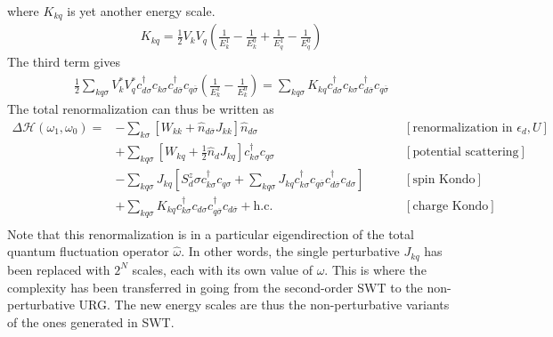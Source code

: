 \documentclass[twoside,11pt]{report}
\numberwithin{equation}{section}
\begin{document}
where \(K_{kq}\) is yet another energy scale.
\begin{equation}\begin{aligned}
	K_{kq} = \frac{1}{2}V_k V_q\left(\frac{1}{E_k^1} - \frac{1}{E_k^0} + \frac{1}{E_q^1} - \frac{1}{E_q^0}\right)
\end{aligned}\end{equation}
The third term gives
\begin{equation}\begin{aligned}
	\frac{1}{2}\sum_{kq\sigma}V^*_k V_q^* c^\dagger_{d\sigma}c_{k\sigma} c^\dagger_{d\overline\sigma}c_{q\overline\sigma}\left(\frac{1}{E_k^1} - \frac{1}{E_k^0}\right) = \sum_{kq\sigma} K_{kq}c^\dagger_{d\sigma}c_{k\sigma} c^\dagger_{d\overline\sigma}c_{q\overline\sigma}
\end{aligned}\end{equation}
The total renormalization can thus be written as
\begin{equation}\begin{aligned}
	\Delta \mathcal{H}(\omega_1,\omega_0) =& - \sum_{k\sigma}\left[W_{kk} + \hat n_{d\overline\sigma}J_{kk}\right]\hat n_{d\sigma} &&&& \left[\text{renormalization in \(\epsilon_d, U\)}\right]\\
					       &+ \sum_{kq\sigma}\left[W_{kq} + \frac{1}{2} \hat n_d J_{kq}\right]c^\dagger_{k\sigma}c_{q\sigma} &&&& \left[\text{potential scattering}\right]\\
					       &- \sum_{kq\sigma}J_{kq}\left[S_d^z \sigma c^\dagger_{k\sigma}c_{q\sigma} + \sum_{kq\sigma}J_{kq} c^\dagger_{k\sigma}c_{q\overline\sigma}c^\dagger_{d\overline\sigma}c_{d\sigma}\right]  &&&& \left[\text{spin Kondo}\right]\\
					       &+ \sum_{kq\sigma}K_{kq}c^\dagger_{k\sigma}c_{d\sigma} c^\dagger_{q\overline\sigma}c_{d\overline\sigma} + \text{h.c.} &&&& \left[\text{charge Kondo}\right]\\
\end{aligned}\end{equation}
Note that this renormalization is in a particular eigendirection of the total quantum fluctuation operator \(\hat \omega\). In other words, the single perturbative \(J_{kq}\) has been replaced with \(2^N\) scales, each with its own value of \(\omega\). This is where the complexity has been transferred in going from the second-order SWT to the non-perturbative URG. The new energy scales are thus the non-perturbative variants of the ones generated in SWT.
\end{document}

